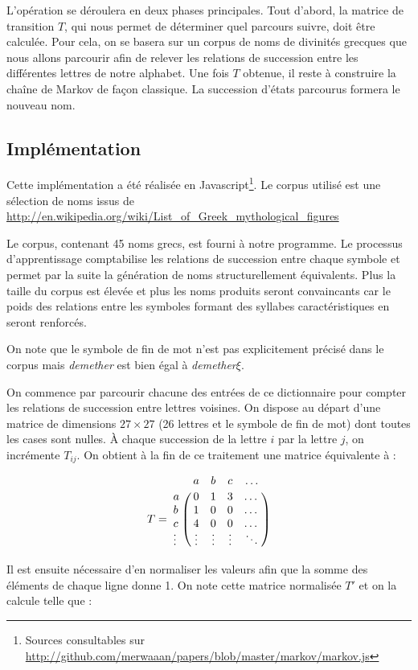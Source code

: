 \documentclass[12pt]{article}
\begin{document}
L'opération se déroulera en deux phases principales. Tout d'abord, la
matrice de transition $T$, qui nous permet de déterminer quel parcours
suivre, doit être calculée. Pour cela, on se basera sur un corpus de
noms de divinités grecques que nous allons parcourir afin de relever
les relations de succession entre les différentes lettres de notre
alphabet. Une fois $T$ obtenue, il reste à construire la chaîne de
Markov de façon classique. La succession d'états parcourus formera le
nouveau nom.

\subsection{Implémentation}

Cette implémentation a été réalisée en Javascript\footnote{Sources
  consultables sur
  \url{http://github.com/merwaaan/papers/blob/master/markov/markov.js}}. Le
corpus utilisé est une sélection de noms issus de
\url{http://en.wikipedia.org/wiki/List_of_Greek_mythological_figures}

Le corpus, contenant 45 noms grecs, est fourni à notre programme. Le
processus d'apprentissage comptabilise les relations de succession
entre chaque symbole et permet par la suite la génération de noms
structurellement équivalents. Plus la taille du corpus est élevée et
plus les noms produits seront convaincants car le poids des relations
entre les symboles formant des syllabes caractéristiques en seront
renforcés.



On note que le symbole de fin de mot n'est pas explicitement précisé
dans le corpus mais \textit{demether} est bien égal à
\textit{demether}$\xi$.

On commence par parcourir chacune des entrées de ce dictionnaire pour
compter les relations de succession entre lettres voisines. On dispose
au départ d'une matrice de dimensions $27 \times 27$ (26 lettres et le
symbole de fin de mot) dont toutes les cases sont nulles. \`A chaque
succession de la lettre $i$ par la lettre $j$, on incrémente
$T_{ij}$. On obtient à la fin de ce traitement une matrice équivalente
à :

$$
T = \bordermatrix{
    & a & b & c & \dots \cr
  a & 0 & 1 & 3 & \dots \cr
  b & 1 & 0 & 0 & \dots \cr
  c & 4 & 0 & 0 & \dots \cr
  \vdots & \vdots & \vdots & \vdots & \ddots \cr
}
$$
\vspace{0.5cm}

Il est ensuite nécessaire d'en normaliser les valeurs afin que la
somme des éléments de chaque ligne donne 1. On note cette matrice
normalisée $T'$ et on la calcule telle que :
\end{document}
